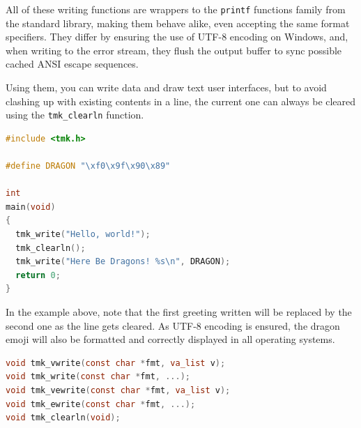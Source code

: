 \documentclass{report}
\begin{document}
All of these writing functions are wrappers to the \texttt{printf} functions family from the standard library, making them behave alike, even accepting the same format specifiers. They differ by ensuring the use of UTF-8 encoding on Windows, and, when writing to the error stream, they flush the output buffer to sync possible cached ANSI escape sequences.

Using them, you can write data and draw text user interfaces, but to avoid clashing up with existing contents in a line, the current one can always be cleared using the \texttt{tmk\_clearln} function.
\begin{lstlisting}[language=c,caption=an example using the writing functions.]
#include <tmk.h>

#define DRAGON "\xf0\x9f\x90\x89"

int
main(void)
{
  tmk_write("Hello, world!");
  tmk_clearln();
  tmk_write("Here Be Dragons! %s\n", DRAGON);
  return 0;
}
\end{lstlisting}

In the example above, note that the first greeting written will be replaced by the second one as the line gets cleared. As UTF-8 encoding is ensured, the dragon emoji will also be formatted and correctly displayed in all operating systems.
\begin{lstlisting}[language=c,caption=the declarations of the writing and clearing functions.]
void tmk_vwrite(const char *fmt, va_list v);
void tmk_write(const char *fmt, ...);
void tmk_vewrite(const char *fmt, va_list v);
void tmk_ewrite(const char *fmt, ...);
void tmk_clearln(void);
\end{lstlisting}
\end{document}
